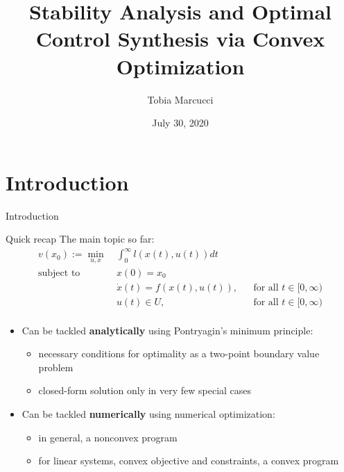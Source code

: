 \documentclass[aspectratio=169]{beamer}
\title[Stability and Control Synthesis via Convex Optimization]{Stability Analysis and Optimal Control Synthesis via Convex Optimization}
\author{Tobia Marcucci}
\institute{\textit{tobiam@mit.edu}}
\date{July 30, 2020}
\begin{document}
\begin{frame}
\titlepage
\end{frame}

\section{Introduction}
\begin{frame}
\huge
\centering
{\color{darkred} Introduction}
\end{frame}

\begin{frame}{Quick recap}
The main topic so far:
\begin{align*}
v(x_0) := \min_{u, x} \ &\int_0^\infty l(x(t), u(t)) dt \\
\text{subject to} \ & x(0) = x_0 \\
& \dot x(t) = f(x(t), u(t)), &&  \text{for all }t \in [0, \infty) \\
& u(t) \in U, &&  \text{for all }t \in [0, \infty) \\
\end{align*}
\begin{itemize}
\item
Can be tackled \textbf{analytically} using Pontryagin's minimum principle:
\begin{itemize}
\item
necessary conditions for optimality as a two-point boundary value problem
\item
closed-form solution only in very few special cases
\end{itemize}
\item
Can be tackled \textbf{numerically} using numerical optimization:
\begin{itemize}
\item
in general, a nonconvex program
\item
for linear systems, convex objective and constraints, a convex program
\end{itemize}
\end{itemize}
\end{frame}
\end{document}
